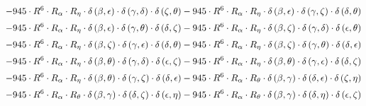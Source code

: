\begin{subequations}
\begin{gather}
 \\[0.2em] \notag 		 - 945 \cdot R^{6} \cdot R_{\alpha{}} \cdot R_{\eta{}} \cdot \delta{}\left(\beta{}, \epsilon{}\right) \cdot \delta{}\left(\gamma{}, \delta{}\right) \cdot \delta{}\left(\zeta{}, \theta{}\right)- 945 \cdot R^{6} \cdot R_{\alpha{}} \cdot R_{\eta{}} \cdot \delta{}\left(\beta{}, \epsilon{}\right) \cdot \delta{}\left(\gamma{}, \zeta{}\right) \cdot \delta{}\left(\delta{}, \theta{}\right) 
 \\[0.2em] \notag 		 - 945 \cdot R^{6} \cdot R_{\alpha{}} \cdot R_{\eta{}} \cdot \delta{}\left(\beta{}, \epsilon{}\right) \cdot \delta{}\left(\gamma{}, \theta{}\right) \cdot \delta{}\left(\delta{}, \zeta{}\right)- 945 \cdot R^{6} \cdot R_{\alpha{}} \cdot R_{\eta{}} \cdot \delta{}\left(\beta{}, \zeta{}\right) \cdot \delta{}\left(\gamma{}, \delta{}\right) \cdot \delta{}\left(\epsilon{}, \theta{}\right) 
 \\[0.2em] \notag 		 - 945 \cdot R^{6} \cdot R_{\alpha{}} \cdot R_{\eta{}} \cdot \delta{}\left(\beta{}, \zeta{}\right) \cdot \delta{}\left(\gamma{}, \epsilon{}\right) \cdot \delta{}\left(\delta{}, \theta{}\right)- 945 \cdot R^{6} \cdot R_{\alpha{}} \cdot R_{\eta{}} \cdot \delta{}\left(\beta{}, \zeta{}\right) \cdot \delta{}\left(\gamma{}, \theta{}\right) \cdot \delta{}\left(\delta{}, \epsilon{}\right) 
 \\[0.2em] \notag 		 - 945 \cdot R^{6} \cdot R_{\alpha{}} \cdot R_{\eta{}} \cdot \delta{}\left(\beta{}, \theta{}\right) \cdot \delta{}\left(\gamma{}, \delta{}\right) \cdot \delta{}\left(\epsilon{}, \zeta{}\right)- 945 \cdot R^{6} \cdot R_{\alpha{}} \cdot R_{\eta{}} \cdot \delta{}\left(\beta{}, \theta{}\right) \cdot \delta{}\left(\gamma{}, \epsilon{}\right) \cdot \delta{}\left(\delta{}, \zeta{}\right) 
 \\[0.2em] \notag 		 - 945 \cdot R^{6} \cdot R_{\alpha{}} \cdot R_{\eta{}} \cdot \delta{}\left(\beta{}, \theta{}\right) \cdot \delta{}\left(\gamma{}, \zeta{}\right) \cdot \delta{}\left(\delta{}, \epsilon{}\right)- 945 \cdot R^{6} \cdot R_{\alpha{}} \cdot R_{\theta{}} \cdot \delta{}\left(\beta{}, \gamma{}\right) \cdot \delta{}\left(\delta{}, \epsilon{}\right) \cdot \delta{}\left(\zeta{}, \eta{}\right) 
 \\[0.2em] \notag 		 - 945 \cdot R^{6} \cdot R_{\alpha{}} \cdot R_{\theta{}} \cdot \delta{}\left(\beta{}, \gamma{}\right) \cdot \delta{}\left(\delta{}, \zeta{}\right) \cdot \delta{}\left(\epsilon{}, \eta{}\right)- 945 \cdot R^{6} \cdot R_{\alpha{}} \cdot R_{\theta{}} \cdot \delta{}\left(\beta{}, \gamma{}\right) \cdot \delta{}\left(\delta{}, \eta{}\right) \cdot \delta{}\left(\epsilon{}, \zeta{}\right) 

\end{gather}
\end{subequations}
